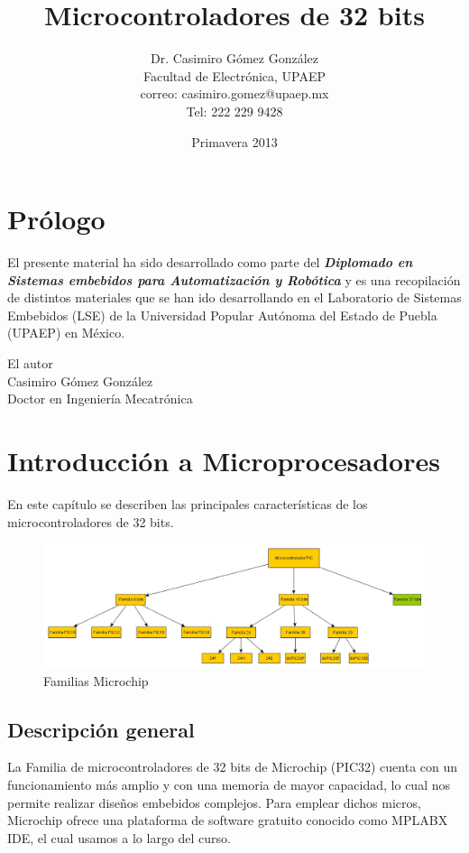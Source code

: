 \documentclass[12pt,letterpaper,twoside]{book}
\title{Microcontroladores de 32 bits}
\author{Dr. Casimiro Gómez González\\
	Facultad de Electrónica, UPAEP\\
               correo: casimiro.gomez@upaep.mx\\
               Tel: 222 229 9428}
\date{Primavera 2013}
\begin{document}
\frontmatter
\maketitle


\chapter{Prólogo}
El presente material ha sido desarrollado como parte del \textit{\textbf{Diplomado en Sistemas embebidos 
para Automatización y Robótica}} y es una recopilación de distintos materiales que se han ido desarrollando en el Laboratorio de Sistemas Embebidos (LSE) de la Universidad Popular Autónoma del Estado de Puebla (UPAEP) en México.
\begin{flushright}

El autor\\
Casimiro Gómez González\\
Doctor en Ingeniería Mecatrónica
\end{flushright}

\tableofcontents
\listoftables
\listoffigures

\mainmatter
\chapter{Introducción a Microprocesadores}
En este capítulo se describen las principales características de los microcontroladores de 32 bits.

\begin{figure}
\centering
\includegraphics[width=6in]{Microchip.jpg}
\caption{Familias Microchip}
\label{fig0}
\end{figure}


\section{Descripción general}
La Familia de microcontroladores de 32 bits de Microchip (PIC32) cuenta con un funcionamiento más amplio y con una memoria de mayor capacidad, lo cual nos permite realizar diseños embebidos complejos.  Para  emplear  dichos micros, Microchip ofrece una plataforma de software gratuito conocido como MPLABX IDE, el cual usamos  a lo largo del curso.
\end{document}

